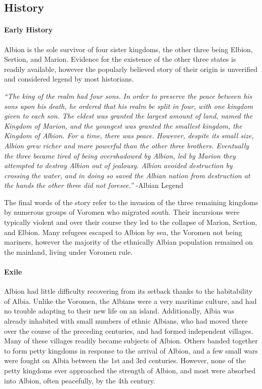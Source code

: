 \subsection{History} 
	
	\paragraph{Early History}
	Albion is the sole survivor of four sister kingdoms, the other three being Elbion, Sertion, and Marion.  Evidence for the existence of the other three states is readily available, however the popularly believed story of their origin is unverified and considered legend by most historians.

	\textit{``The king of the realm had four sons.  In order to preserve the peace between his sons upon his death, he ordered that his realm be split in four, with one kingdom given to each son.  The eldest was granted the largest amount of land, named the Kingdom of Marion, and the youngest was granted the smallest kingdom, the Kingdom of Albion.  For a time, there was peace.  However, despite its small size, Albion grew richer and more powerful than the other three brothers.  Eventually the three became tired of being overshadowed by Albion, led by Marion they attempted to destroy Albion out of jealousy.  Albion avoided destruction by crossing the water, and in doing so saved the Albian nation from destruction at the hands the other three did not foresee.''} -Albian Legend

	The final words of the story refer to the invasion of the three remaining kingdoms by numerous groups of Voromen who migrated south.  Their incursions were typically violent and over their course they led to the collapse of Marion, Sertion, and Elbion.  Many refugees escaped to Albion by sea, the Voromen not being mariners, however the majority of the ethnically Albian population remained on the mainland, living under Voromen rule.

	\paragraph{Exile}

	Albion had little difficulty recovering from its setback thanks to the habitability of Albia.  Unlike the Voromen, the Albians were a very maritime culture, and had no trouble adapting to their new life on an island.  Additionally, Albia was already inhabited with small numbers of ethnic Albians, who had moved there over the course of the preceding centuries, and had formed independent villages.  Many of these villages readily became subjects of Albion.  Others banded together to form petty kingdoms in response to the arrival of Albion, and a few small wars were fought on Albia between the 1st and 3rd centuries.  However, none of the petty kingdoms ever approached the strength of Albion, and most were absorbed into Albion, often peacefully, by the 4th century. 

